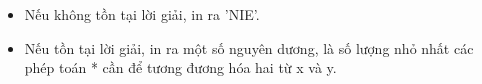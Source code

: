 \begin{itemize}
	\item     Nếu không tồn tại lời giải, in ra 'NIE'.   
	\item     Nếu tồn tại lời giải, in ra một số nguyên dương, là số lượng nhỏ nhất các phép toán * cần để tương đương hóa hai từ x và y.   
\end{itemize}
